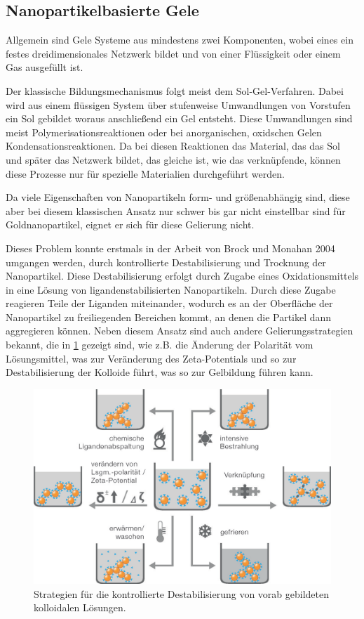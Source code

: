     
    \subsection{Nanopartikelbasierte Gele}
    
    Allgemein sind Gele Systeme aus mindestens zwei Komponenten, wobei eines ein festes dreidimensionales Netzwerk bildet und von einer Flüssigkeit oder einem Gas ausgefüllt ist. \autocite{Aleman2007}
    
    Der klassische Bildungsmechanismus folgt meist dem Sol-Gel-Verfahren. \autocite{Ziegler2017}
    Dabei wird aus einem flüssigen System über stufenweise Umwandlungen von Vorstufen ein Sol gebildet woraus anschließend ein Gel entsteht. \autocite{Aleman2007}
    Diese Umwandlungen sind meist Polymerisationsreaktionen oder bei anorganischen, oxidschen Gelen Kondensationsreaktionen. 
    Da bei diesen Reaktionen das Material, das das Sol und später das Netzwerk bildet, das gleiche ist, wie das verknüpfende, können diese Prozesse nur für spezielle Materialien durchgeführt werden.
    
    Da viele Eigenschaften von Nanopartikeln form- und größenabhängig sind, diese aber bei diesem klassischen Ansatz nur schwer bis gar nicht einstellbar sind für Goldnanopartikel, eignet er sich für diese Gelierung nicht.
    
    Dieses Problem konnte erstmals in der Arbeit von Brock und Monahan 2004 umgangen werden, durch kontrollierte Destabilisierung und Trocknung der Nanopartikel. \autocite{Mohanan2004,Mohanan2005}
    Diese Destabilisierung erfolgt durch Zugabe eines Oxidationsmittels in eine Lösung von ligandenstabilisierten Nanopartikeln.
    Durch diese Zugabe reagieren Teile der Liganden miteinander, wodurch es  an der Oberfläche der Nanopartikel zu freiliegenden Bereichen kommt, an denen die Partikel dann aggregieren können.
    Neben diesem Ansatz sind auch andere Gelierungsstrategien bekannt, die in \cref{fig:Destabilisierung} gezeigt sind, wie z.B. die Änderung der Polarität vom Lösungsmittel, was zur Veränderung des Zeta-Potentials und so zur Destabilisierung der Kolloide führt, was so zur Gelbildung führen kann.
    
    \begin{figure}[H]
        \centering
        \includegraphics[width=0.6\linewidth]{Bilder/Gelierung.png}
        \caption{Strategien für die kontrollierte Destabilisierung von vorab gebildeten kolloidalen Lösungen.\autocite{Aleman2007}}
        \label{fig:Destabilisierung}
    \end{figure}
    
